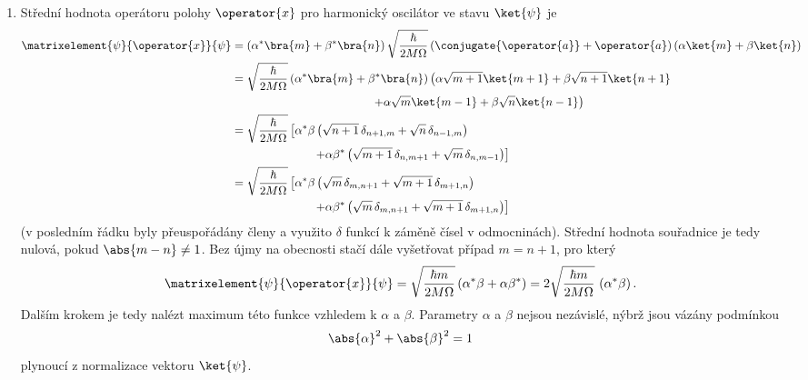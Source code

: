\begin{solution}
	\begin{enumerate}
	\item
		Střední hodnota operátoru polohy $\operator{x}$ pro harmonický oscilátor ve stavu $\ket{\psi}$ je
		\begin{align}
			\matrixelement{\psi}{\operator{x}}{\psi}
				&=\left(\alpha^{*}\bra{m}+\beta^{*}\bra{n}\right)
					\sqrt{\frac{\hbar}{2M\Omega}}\left(\conjugate{\operator{a}}+\operator{a}\right)
					\left(\alpha\ket{m}+\beta\ket{n}\right)\nonumber\\
				&=\sqrt{\frac{\hbar}{2M\Omega}}
					\left(\alpha^{*}\bra{m}+\beta^{*}\bra{n}\right)		
					\left(\alpha\sqrt{m+1}\ket{m+1}+\beta\sqrt{n+1}\ket{n+1}\right.\nonumber\\
				&\qquad\qquad\qquad\qquad\qquad\qquad
					\left.+\alpha\sqrt{m}\ket{m-1}+\beta\sqrt{n}\ket{n-1}\right)\nonumber\\
				&=\sqrt{\frac{\hbar}{2M\Omega}}\left[
					\alpha^{*}\beta\left(\sqrt{n+1}\,\delta_{n+1,m}+\sqrt{n}\,\delta_{n-1,m}\right)
					\right.\nonumber\\
				&\qquad\qquad\quad\qquad\left.
					+\alpha\beta^{*}\left(\sqrt{m+1}\,\delta_{n,m+1}+\sqrt{m}\,\delta_{n,m-1}\right)
					\right]\nonumber\\
				&=\sqrt{\frac{\hbar}{2M\Omega}}\left[
					\alpha^{*}\beta\left(\sqrt{m}\,\delta_{m,n+1}+\sqrt{m+1}\,\delta_{m+1,n}\right)
					\right.\nonumber\\
				&\qquad\qquad\quad\qquad\left.
					+\alpha\beta^{*}\left(\sqrt{m}\,\delta_{m,n+1}+\sqrt{m+1}\,\delta_{m+1,n}\right)
					\right]
		\end{align}
		(v posledním řádku byly přeuspořádány členy a využito $\delta$ funkcí k záměně čísel v odmocninách).
		Střední hodnota souřadnice je tedy nulová, pokud $\abs{m-n}\neq1$.
		Bez újmy na obecnosti stačí dále vyšetřovat případ $m=n+1$, pro který
		\begin{equation}\label{eq:MeanX}
			\matrixelement{\psi}{\operator{x}}{\psi}
				=\sqrt{\frac{\hbar m}{2M\Omega}}\left(\alpha^{*}\beta+\alpha\beta^{*}\right)
				=2\sqrt{\frac{\hbar m}{2M\Omega}}\,\real\left(\alpha^{*}\beta\right).
        \end{equation}
        Dalším krokem je tedy nalézt maximum této funkce vzhledem k $\alpha$ a $\beta$.
		Parametry $\alpha$ a $\beta$ nejsou nezávislé, nýbrž jsou vázány podmínkou
		\begin{equation}\label{eq:AlphaBetaNormalization}
			\abs{\alpha}^{2}+\abs{\beta}^{2}=1
		\end{equation}
        plynoucí z normalizace vektoru $\ket{\psi}$.
        

\end{enumerate}
\end{solution}
